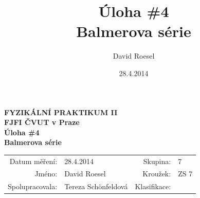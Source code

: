 \documentclass[english]{article}
\newcommand{\Author}{David Roesel}
\newcommand{\Coauthor}{Tereza Schönfeldová}
\newcommand{\Institute}{FJFI ČVUT v Praze}
\newcommand{\Subject}{FYZIKÁLNÍ PRAKTIKUM II}
\newcommand{\Group}{7}
\newcommand{\Circle}{ZS 7}
\newcommand{\Title}{Úloha \#4  \\Balmerova série}
\newcommand{\Date}{28.4.2014}
\begin{document}
\author{\Author}
\title{\Title}
\date{\Date}

\renewcommand{\figurename}{Obr.}
\renewcommand{\tablename}{Tab.}
\renewcommand{\refname}{Reference}


\setlength{\parindent}{0cm}
\begin{multicols}{2}
\textbf{\Subject \\
        \Institute \\[0.1cm]
\Title \\[0.5cm]
}
\begin{tabular}{rlrl}
\large Datum měření: & \Date & \large Skupina: & \Group \\
\large Jméno: & \Author & \large Kroužek:  & \Circle\\
\large Spolupracovala: & \Coauthor &\large Klasifikace:\\
\end{tabular}


\end{multicols}
\end{document}
